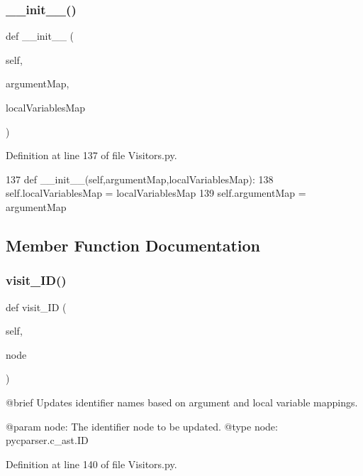 \subsubsection{\texorpdfstring{\+\_\+\+\_\+init\+\_\+\+\_\+()}{\_\_init\_\_()}}
{\footnotesize\ttfamily def \+\_\+\+\_\+init\+\_\+\+\_\+ (\begin{DoxyParamCaption}\item[{}]{self,  }\item[{}]{argument\+Map,  }\item[{}]{local\+Variables\+Map }\end{DoxyParamCaption})}



Definition at line 137 of file Visitors.\+py.


\begin{DoxyCode}
137     \textcolor{keyword}{def }\_\_init\_\_(self,argumentMap,localVariablesMap):
138         self.localVariablesMap = localVariablesMap
139         self.argumentMap = argumentMap
\end{DoxyCode}


\subsection{Member Function Documentation}
\mbox{\label{classVisitors_1_1IdVisitor_a876b22ca4502c2197e9881ebf8fb6288}} 
\subsubsection{\texorpdfstring{visit\+\_\+\+I\+D()}{visit\_ID()}}
{\footnotesize\ttfamily def visit\+\_\+\+ID (\begin{DoxyParamCaption}\item[{}]{self,  }\item[{}]{node }\end{DoxyParamCaption})}

\begin{DoxyVerb}@brief Updates identifier names based on argument and local variable mappings.

@param node: The identifier node to be updated.
@type node: pycparser.c_ast.ID
\end{DoxyVerb}
 

Definition at line 140 of file Visitors.\+py.


